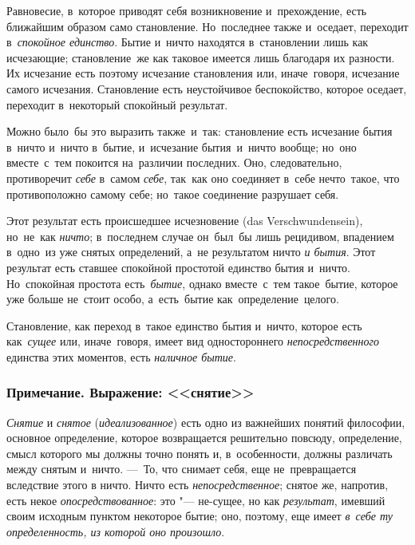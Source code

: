 Равновесие, в~которое приводят себя
возникновение и~прехождение, есть ближайшим образом само становление.
Но~последнее также и~оседает, переходит в~{\em спокойное
единство}. Бытие и~ничто находятся в~становлении лишь как исчезающие;
становление~же как таковое имеется лишь благодаря их разности. Их исчезание
есть поэтому исчезание становления или, иначе~говоря, исчезание самого
исчезания. Становление есть неустойчивое беспокойство, которое оседает,
переходит в~некоторый спокойный результат.

Можно было~бы это выразить также~и~так: становление есть исчезание бытия
в~ничто и~ничто в~бытие, и~исчезание бытия~и~ничто вообще; но~оно
вместе~с~тем покоится на~различии последних. Оно, следовательно,
противоречит {\em себе} в~самом {\em себе}, так~как
оно соединяет в~себе нечто~такое, что противоположно самому себе;
но~такое соединение разрушает себя.

Этот результат есть происшедшее исчезновение (das Verschwundensein),
но~не~как {\em ничто}; в~последнем случае он~был~бы лишь
рецидивом, впадением в~одно~из уже снятых определений, а~не результатом
ничто {\em и бытия}. Этот результат есть ставшее
спокойной простотой единство бытия и~ничто. Но~спокойная простота
есть~{\em бытие}, однако вместе~с~тем такое~бытие, которое
уже больше не~стоит особо, а~есть~бытие как~определение~целого.

Становление, как переход в~такое единство бытия и~ничто, которое есть
как~{\em сущее} или, иначе~говоря, имеет вид одностороннего
{\em непосредственного} единства этих моментов, есть
{\em наличное бытие}.

\subsubsection[Примечание. Выражение: <<снятие>>]
{Примечание. Выражение: <<снятие>>}

{\em Снятие} и {\em снятое}
({\em идеализованное}) есть одно из важнейших понятий
философии, основное определение, которое возвращается решительно повсюду,
определение, смысл которого мы должны точно понять и, в~особенности,
должны различать между снятым и~ничто. ---~То, что снимает себя, еще
не~превращается вследствие этого в ничто. Ничто есть
{\em непосредственное}; снятое же, напротив, есть некое
{\em опосредствованное}: это "--- не-сущее, но как
{\em результат}, имевший своим исходным пунктом
некоторое бытие; оно, поэтому, еще имеет {\em в~себе ту
определенность, из которой оно произошло}.


